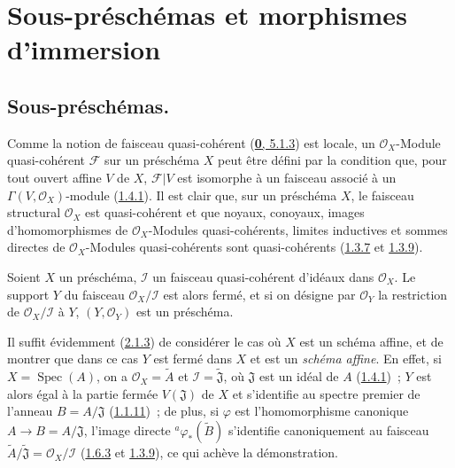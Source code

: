 \section{Sous-préschémas et morphismes d'immersion}
\label{section:I.4-fr}

\subsection{Sous-préschémas.}
\label{subsection:I.4.1-fr}

\begin{env}[4.1.1]
\label{I.4.1.1-fr}
Comme la notion de faisceau quasi-cohérent
(\hyperref[0.5.1.3-fr]{\textbf{0}, 5.1.3}) est locale, un
$\mathscr{O}_X$-Module quasi-cohérent $\mathscr{F}$ sur un préschéma $X$ peut
être défini par la condition que, pour tout ouvert affine $V$ de $X$,
$\mathscr{F}|V$ est isomorphe à un faisceau associé à un
$\Gamma(V,\mathscr{O}_X)$-module (\hyperref[I.1.4.1-fr]{1.4.1}). Il est clair
que, sur un préschéma $X$, le faisceau structural $\mathscr{O}_X$ est
quasi-cohérent et que noyaux, conoyaux, images d'homomorphismes de
$\mathscr{O}_X$-Modules quasi-cohérents, limites inductives et sommes directes
de $\mathscr{O}_X$-Modules quasi-cohérents sont quasi-cohérents
(\hyperref[I.1.3.7-fr]{1.3.7} et \hyperref[I.1.3.9-fr]{1.3.9}).
\end{env}

\begin{proposition}[4.1.2]
\label{I.4.1.2-fr}
Soient $X$ un préschéma, $\mathscr{I}$ un faisceau quasi-cohérent d'idéaux
dans $\mathscr{O}_X$. Le support $Y$ du faisceau
$\mathscr{O}_X/\mathscr{I}$ est alors fermé, et si on désigne par
$\mathscr{O}_Y$ la restriction de $\mathscr{O}_X/\mathscr{I}$ à $Y$,
$(Y,\mathscr{O}_Y)$ est un préschéma.
\end{proposition}

Il suffit évidemment (\hyperref[I.2.1.3-fr]{2.1.3}) de considérer le cas où
$X$ est un schéma affine, et de montrer que dans ce cas $Y$ est fermé dans
$X$ et est un \emph{schéma affine}. En effet, si
$X=\operatorname{Spec}(A)$, on a $\mathscr{O}_X=\widetilde{A}$ et
$\mathscr{I}=\widetilde{\mathfrak{J}}$, où $\mathfrak{J}$ est un idéal de
$A$ (\hyperref[I.1.4.1-fr]{1.4.1})~; $Y$ est alors égal à la partie fermée
$V(\mathfrak{J})$ de $X$ et s'identifie au spectre premier de l'anneau
$B=A/\mathfrak{J}$ (\hyperref[I.1.1.11-fr]{1.1.11})~; de plus, si $\varphi$
est l'homomorphisme canonique $A\to B=A/\mathfrak{J}$, l'image directe
${}^a\varphi_*(\widetilde{B})$ s'identifie canoniquement au faisceau
$\widetilde{A}/\widetilde{\mathfrak{J}}=\mathscr{O}_X/\mathscr{I}$
(\hyperref[I.1.6.3-fr]{1.6.3} et \hyperref[I.1.3.9-fr]{1.3.9}), ce qui achève
la démonstration.


